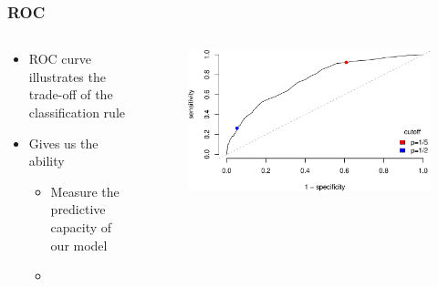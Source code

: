 \documentclass[
  shownotes,
  xcolor={svgnames},
  hyperref={colorlinks,citecolor=DarkBlue,linkcolor=DarkRed,urlcolor=DarkBlue}
  , aspectratio=169]{beamer}
\begin{document}
\begin{frame}[fragile]
\frametitle{ROC}


\begin{columns}[T] %
\begin{column}{.52\textwidth}
\begin{itemize}
\item ROC curve illustrates the trade-off of the classification rule
\medskip
\item Gives us the ability
\begin{itemize}
  \item Measure the predictive capacity of our model
  \medskip
  \item $\,$
  \medskip
\end{itemize}
\end{itemize}
\end{column}  
\hfill
\begin{column}{.48\textwidth}

 \begin{figure}[H] \centering
            \captionsetup{justification=centering}
              \includegraphics[scale=0.4]{../Lecture19/figures/roc}                            
 \end{figure}

\end{column}
\end{columns}


\end{frame}
\end{document}
